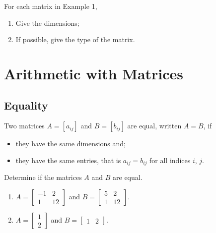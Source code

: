 \documentclass[12pt,a4paper]{article}
\newcounter{example}[section]
\begin{document}
\begin{example}
For each matrix in Example 1,
	\begin{multicols}{2}
	\begin{enumerate}
	\item Give the dimensions;
	\item If possible, give the type of the matrix.
	\end{enumerate}
	\end{multicols}
\end{example}

\newpage

\section{Arithmetic with Matrices}

\subsection{Equality}
Two matrices $A = [a_{ij}]$ and $B = [b_{ij}]$ are equal, written $A = B$, if 
	\begin{itemize}
	\item they have the same dimensions and;
	\item they have the same entries, that is $a_{ij} = b_{ij}$ for all indices $i$, $j$.
	\end{itemize}
	
	\begin{example}
	Determine if the matrices $A$ and $B$ are equal.
		\begin{multicols}{2}
		\begin{enumerate}
		\item $A = \begin{bmatrix}
		-1 & 2 \\ 1 & 12
		\end{bmatrix}$ and $B = \begin{bmatrix}
		5 & 2 \\ 1 & 12
		\end{bmatrix}$.
		\item $A = \begin{bmatrix}
		1 \\ 2
		\end{bmatrix}$ and $B = \begin{bmatrix}
		1 & 2
		\end{bmatrix}$.
		\end{enumerate}
		\end{multicols}
	\end{example}
	
\end{document}
